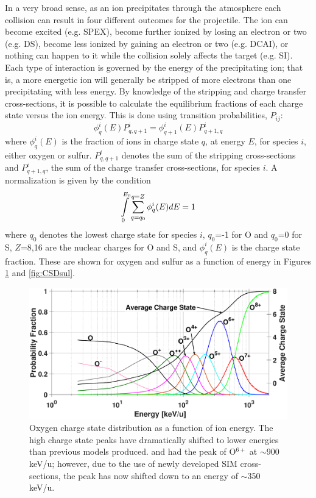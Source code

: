 \documentclass[draft]{agujournal2018}
\begin{document}
In a very broad sense, as an ion precipitates through the atmosphere each collision can result in four different outcomes for the projectile.
The ion can become excited (e.g. SPEX), become further ionized by losing an electron or two (e.g. DS), become less ionized by gaining an electron or two (e.g. DCAI), or nothing can happen to it while the collision solely affects the target (e.g. SI).
Each type of interaction is governed by the energy of the precipitating ion; that is, a more energetic ion will generally be stripped of more electrons than one precipitating with less energy.
By knowledge of the stripping and charge transfer cross-sections, it is possible to calculate the equilibrium fractions of each charge state versus the ion energy.
This is done using transition probabilities, $P_{ij}$:
\begin{equation}
    \phi_{q}^{i}(E) P^i_{q,q+1}=\phi_{q+1}^{i}(E) P^i_{q+1,q}
    \label{eqn:EqProb}
\end{equation}
where $\phi_q^i(E)$ is the fraction of ions in charge state $q$, at energy $E$, for species $i$, either oxygen or sulfur.
$P^i_{q,q+1}$ denotes the sum of the stripping cross-sections and $P^i_{q+1,q}$, the sum of the charge transfer cross-sections, for species $i$.
A normalization is given by the condition
\begin{equation}
    \int\displaylimits_{0}^{E_0}\sum_{q=q_0}^{q=Z}\phi^i_q(E)dE=1
    \label{eqn:EqProbNorm}
\end{equation}
where $q_0$ denotes the lowest charge state for species $i$, $q_0$=-1 for O and $q_0$=0 for S, $Z$=8,16 are the nuclear charges for O and S, and $\phi_q^i(E)$ is the charge state fraction.
These are shown for oxygen and sulfur as a function of energy in Figures \ref{fig:CSDoxy} and \ref{fig:CSDsul}.

\begin{figure}[ht]
    \centering
    \includegraphics[width=\textwidth]{Figures/CSDoxy.eps}
    \caption{Oxygen charge state distribution as a function of ion energy. The high charge state peaks have dramatically shifted to lower energies than previous models produced. \citet{houston2018} and \citet{ozak2010} had the peak of O$^{6+}$ at $\sim$900 keV/u; however, due to the use of newly developed SIM cross-sections, the peak has now shifted down to an energy of $\sim$350 keV/u.}
    \label{fig:CSDoxy}
\end{figure}
\end{document}
